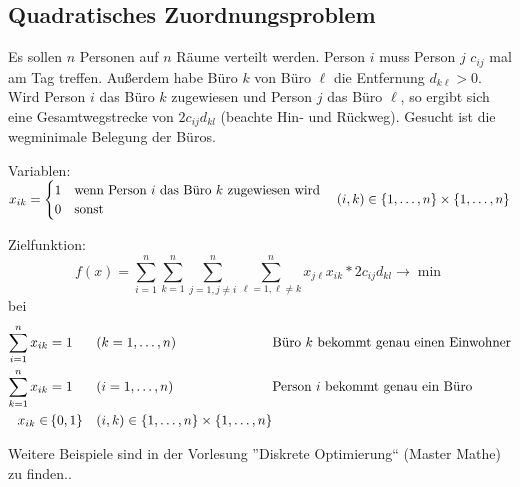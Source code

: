 \subsection{Quadratisches Zuordnungsproblem}

Es sollen $n$ Personen auf $n$ Räume verteilt werden. Person $i$ muss Person $j$ $c_{ij}$ mal am Tag treffen. Außerdem habe Büro $k$ von Büro $\ell$ die Entfernung $d_{k \ell}>0$. Wird Person $i$ das Büro $k$ zugewiesen und Person $j$ das Büro $\ell$, so ergibt sich eine Gesamtwegstrecke von $2 c_{ij} d_{kl}$ (beachte Hin- und Rückweg). Gesucht ist die wegminimale Belegung der Büros.

Variablen: $x_{ik} = \begin{cases}
	1 & \text{wenn Person $i$ das Büro $k$ zugewiesen wird} \\ 0 & \text{sonst}
	\end{cases} \quad (i,k) \in \left\{ 1, \dots , n \right\} \times \left\{ 1, \dots , n \right\}$
	
Zielfunktion:
\begin{equation*}
	f(x) = \sum_{i=1}^n \sum_{k=1}^n \sum_{j=1, j \neq i}^n \sum_{\ell =1, \ell \neq k}^n x_{j \ell} x_{i k} * 2c_{ij} d_{kl} \to \min
\end{equation*}
bei
\begin{equation*}
	\begin{alignedat}{3}
	\sum_{i=1}^n x_{ik} &= 1 \quad &&(k = 1, \dots, n) \quad &&\text{Büro $k$ bekommt genau einen Einwohner} \\
	\sum_{k=1}^n x_{ik} &= 1 &&(i = 1, \dots, n) &&\text{Person $i$ bekommt genau ein Büro} \\
	x_{ik} \in &\left\{ 0,1 \right\} \quad &&(i,k) \in \left\{ 1, \dots , n \right\} \times \left\{ 1, \dots , n \right\} &&
	\end{alignedat}
\end{equation*}

Weitere Beispiele sind in der Vorlesung ''Diskrete Optimierung`` (Master Mathe) zu finden..
